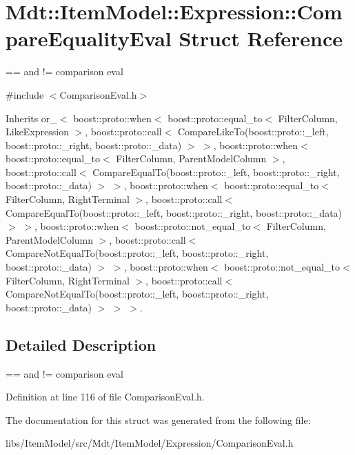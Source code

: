 \hypertarget{struct_mdt_1_1_item_model_1_1_expression_1_1_compare_equality_eval}{}\section{Mdt\+:\+:Item\+Model\+:\+:Expression\+:\+:Compare\+Equality\+Eval Struct Reference}
\label{struct_mdt_1_1_item_model_1_1_expression_1_1_compare_equality_eval}


== and != comparison eval  




{\ttfamily \#include $<$Comparison\+Eval.\+h$>$}



Inherits or\+\_\+$<$ boost\+::proto\+::when$<$ boost\+::proto\+::equal\+\_\+to$<$ Filter\+Column, Like\+Expression $>$, boost\+::proto\+::call$<$ Compare\+Like\+To(boost\+::proto\+::\+\_\+left, boost\+::proto\+::\+\_\+right, boost\+::proto\+::\+\_\+data) $>$ $>$, boost\+::proto\+::when$<$ boost\+::proto\+::equal\+\_\+to$<$ Filter\+Column, Parent\+Model\+Column $>$, boost\+::proto\+::call$<$ Compare\+Equal\+To(boost\+::proto\+::\+\_\+left, boost\+::proto\+::\+\_\+right, boost\+::proto\+::\+\_\+data) $>$ $>$, boost\+::proto\+::when$<$ boost\+::proto\+::equal\+\_\+to$<$ Filter\+Column, Right\+Terminal $>$, boost\+::proto\+::call$<$ Compare\+Equal\+To(boost\+::proto\+::\+\_\+left, boost\+::proto\+::\+\_\+right, boost\+::proto\+::\+\_\+data) $>$ $>$, boost\+::proto\+::when$<$ boost\+::proto\+::not\+\_\+equal\+\_\+to$<$ Filter\+Column, Parent\+Model\+Column $>$, boost\+::proto\+::call$<$ Compare\+Not\+Equal\+To(boost\+::proto\+::\+\_\+left, boost\+::proto\+::\+\_\+right, boost\+::proto\+::\+\_\+data) $>$ $>$, boost\+::proto\+::when$<$ boost\+::proto\+::not\+\_\+equal\+\_\+to$<$ Filter\+Column, Right\+Terminal $>$, boost\+::proto\+::call$<$ Compare\+Not\+Equal\+To(boost\+::proto\+::\+\_\+left, boost\+::proto\+::\+\_\+right, boost\+::proto\+::\+\_\+data) $>$ $>$ $>$.



\subsection{Detailed Description}
== and != comparison eval 

Definition at line 116 of file Comparison\+Eval.\+h.



The documentation for this struct was generated from the following file\+:\begin{DoxyCompactItemize}
\item 
libs/\+Item\+Model/src/\+Mdt/\+Item\+Model/\+Expression/Comparison\+Eval.\+h\end{DoxyCompactItemize}
